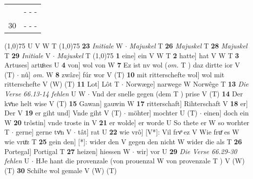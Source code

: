 \documentclass[8pt,a4paper,notitlepage]{article}
\begin{document}
\begin{table}[ht]
\begin{minipage}[t]{0.5\linewidth}
\begin{tabular}{rl}
 & \multicolumn{1}{l}{ - - - }\\ 
30 & \multicolumn{1}{l}{ - - - }\\ 
\end{tabular}
\scriptsize
\line(1,0){75} \newline
U V W T \newline
\line(1,0){75} \newline
\textbf{23} \textit{Initiale} W   $\cdot$ \textit{Majuskel} T  \textbf{26} \textit{Majuskel} T  \textbf{28} \textit{Majuskel} T  \textbf{29} \textit{Initiale} V   $\cdot$ \textit{Majuskel} T  \newline
\line(1,0){75} \newline
\textbf{1} eine] ein V W T \textbf{2} hatte] hat V W T \textbf{3} Artuses] artuͦses U \textbf{4} von] wol von W \textbf{7} Ez ist nv wol (\textit{om.} T ) daz dirtte ior V (T)  $\cdot$ nû] \textit{om.} W \textbf{8} zwâre] fúr wor V (T) \textbf{10} mit ritterschefte wol] wol mit ritterschefte V (W) (T) \textbf{11} Lot] Lôt T  $\cdot$ Norwæge] narwege W Norwêge T \textbf{13} \textit{Die Verse 66.13-14 fehlen} U W   $\cdot$ Vnd der snelle gegen (dem T ) prise V (T) \textbf{14} Der kvͤne helt wise V (T) \textbf{15} Gawan] gauwin W \textbf{17} ritterschaft] Rihterschaft V \textbf{18} er] Der V \textbf{19} er giht und] Vnde giht V (T)  $\cdot$ möhter] mochter U (T)  $\cdot$ einen] doch ein W \textbf{20} trôstin] vnde troste in V \textbf{21} er wolde] er worde U So thete er W so worhter T  $\cdot$ gerne] gerne tvͦn V  $\cdot$ tât] rat U \textbf{22} wie vrô] [V*]: Vil frvͦ ez V Wie fruͤ es W wie vruͦz T \textbf{25} gein den] [*]: wider den V gegen den nicht W wider die als T \textbf{26} Portegal] Portigal T \textbf{27} heizen] hiessen W  $\cdot$ wir] vor U \textbf{29} \textit{Die Verse 66.29-30 fehlen} U   $\cdot$ HJe hant die provenzale (von prouenzal W von provenzale T ) V (W) (T) \textbf{30} Schilte wol gemale V (W) (T) \newline
\end{minipage}
\end{table}
\end{document}
